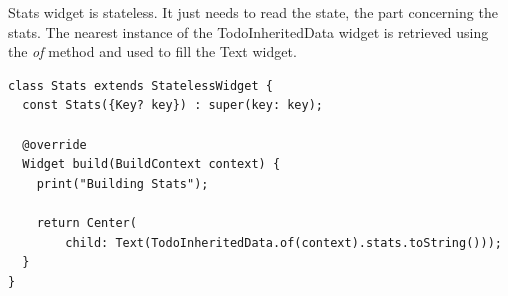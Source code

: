 Stats widget is stateless. It just needs to read the state, the part concerning the stats. The nearest instance of the TodoInheritedData widget is retrieved using the \textit{of} method and used to fill the Text widget.
\mbox{}\\
\mbox{}
\begin{code}
\label{code:2.29}
\begin{verbatim}
class Stats extends StatelessWidget {
  const Stats({Key? key}) : super(key: key);

  @override
  Widget build(BuildContext context) {
    print("Building Stats");

    return Center(
        child: Text(TodoInheritedData.of(context).stats.toString()));
  }
}
\end{verbatim}
\end{code}

